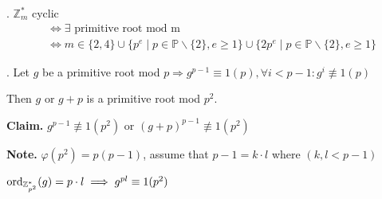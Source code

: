 \Theorem.
$\mathbb{Z}_m^{*}$ cyclic
\begin{align*}
  & \Leftrightarrow \exists \text{ primitive root mod m} \\
  & \Leftrightarrow m \in \{2,4\} \cup \{ p^e \mid p \in \mathbb{P} \backslash \{2\}, e \geq 1 \} \cup \{ 2p^e \mid p \in \mathbb{P} \backslash \{2\}, e \geq 1 \}
\end{align*}

\Proof.
Let $g$ be a primitive root mod $p \Rightarrow g^{p-1} \equiv 1 (p), \forall i < p-1 : g^i \not\equiv 1 (p) $

Then $g$ or $g+p$ is a primitive root mod $p^2$.

\textbf{Claim.}
$g^{p-1} \not\equiv 1 (p^2)$ or $(g+p)^{p-1} \not\equiv 1 (p^2)$

\textbf{Note.}
$\varphi(p^2) = p(p-1)$, assume that $p-1 = k \cdot l$ where $(k, l < p-1)$

$\operatorname{ord}_{\mathbb{Z}^{*}_{p^2}}(g) = p \cdot l \implies g^{pl} \equiv 1 (p^2)$
